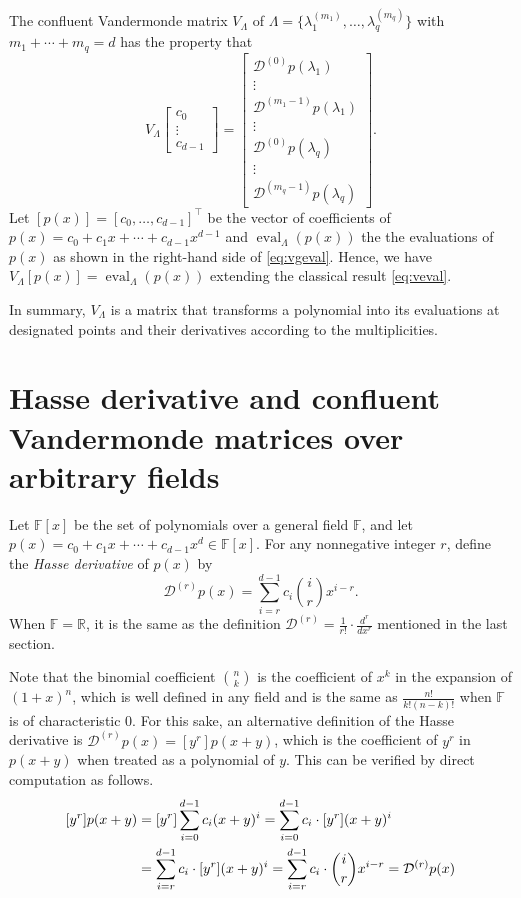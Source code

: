 \documentclass{article}
\theoremstyle{definition}
\newcommand{\trans}{^\top}
\newcommand{\eval}{\operatorname{eval}}
\begin{document}
The confluent Vandermonde matrix $V_\Lambda$ of 
$\Lambda = \{\lambda_1^{(m_1)}, \ldots, \lambda_q^{(m_q)}\}$ with $m_1 + \cdots + m_q = d$  
has the property that 
\begin{equation}
\label{eq:vgeval}
    V_\Lambda 
    \begin{bmatrix} c_0 \\ \vdots \\ c_{d-1} \end{bmatrix} = 
    \begin{bmatrix}
    \mathcal{D}^{(0)}p(\lambda_1) \\ \vdots \\ \mathcal{D}^{(m_1-1)}p(\lambda_1) \\ 
    \vdots \\
    \mathcal{D}^{(0)}p(\lambda_q) \\ \vdots \\ \mathcal{D}^{(m_q-1)}p(\lambda_q)
    \end{bmatrix}.
\end{equation}
Let $[p(x)] = [c_0, \dots, c_{d-1}]\trans$ 
be the vector of coefficients of $p(x) = c_0 + c_1x + \cdots + c_{d-1}x^{d-1}$ 
and $\eval_\Lambda(p(x))$ the the evaluations of $p(x)$ 
as shown in the right-hand side of \cref{eq:vgeval}.  
Hence, we have $V_\Lambda [p(x)] = \eval_\Lambda(p(x))$ extending the classical result \cref{eq:veval}.

In summary, $V_\Lambda$ is a matrix that transforms a polynomial into its evaluations at designated points
and their derivatives according to the multiplicities.  

\section{Hasse derivative and confluent Vandermonde matrices over arbitrary fields}
 
Let ${\mathbb F}[x]$ be the set of polynomials over 
a general field $\mathbb{F}$, and let 
$p(x) = c_0 + c_1x + \cdots + c_{d-1}x^d\in {\mathbb F}[x]$.
For any nonnegative integer $r$, define the \emph{Hasse derivative} of $p(x)$ by
\[
    \mathcal{D}^{(r)} p(x) = 
    \sum_{i = r}^{d-1} c_i\binom{i}{r}x^{i-r}.
\]  
When $\mathbb{F} = \mathbb{R}$, it is the same as the definition $\mathcal{D}^{(r)} = \frac{1}{r!}\cdot \frac{d^r}{dx^r}$ 
mentioned in the last section. 

Note that the binomial coefficient $\binom{n}{k}$ is the coefficient of $x^k$ in the expansion of $(1 + x)^n$, which is well 
defined in any field and is the same as $\frac{n!}{k!(n-k)!}$ when $\mathbb{F}$ is of characteristic $0$.  For this sake, an 
alternative definition of the Hasse derivative is $\mathcal{D}^{(r)}p(x) = [y^r]p(x + y)$, which is the coefficient of $y^r$ in 
$p(x + y)$ when treated as a polynomial of $y$.  This can be verified by direct computation as follows.
\[
    \begin{aligned}\relax
        [y^r]p(x + y) &= [y^r]\sum_{i=0}^{d-1} c_i(x+y)^i
        = \sum_{i=0}^{d-1} c_i \cdot [y^r] (x+y)^i \\
        &= \sum_{i=r}^{d-1} c_i \cdot [y^r] (x+y)^i 
        = \sum_{i=r}^{d-1} c_i \cdot \binom{i}{r}x^{i-r} = \mathcal{D}^{(r)}p(x)
    \end{aligned}
\]
\end{document}
